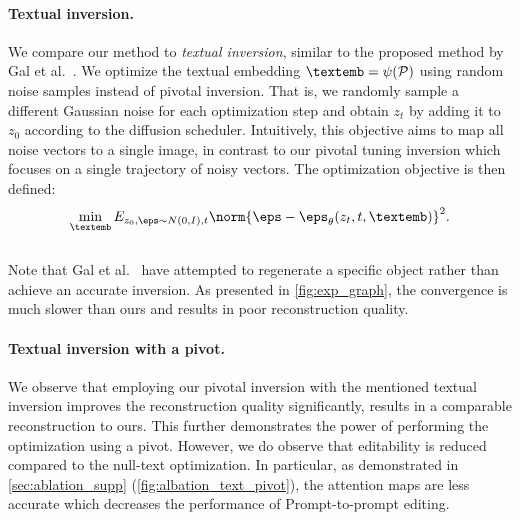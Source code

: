 \vspace{-0.4cm}
\paragraph{Textual inversion.}
We compare our method to \textit{textual inversion}, similar to the proposed method by Gal et al.~\cite{gal2022image}. We optimize the textual embedding $\textemb = \psi(\mathcal{P})$ using random noise samples instead of pivotal inversion. 
That is, we randomly sample a different Gaussian noise for each optimization step and obtain $z_t$ by adding it to $z_0$ according to the diffusion scheduler. Intuitively, this objective aims to map all noise vectors to a single image, in contrast to our pivotal tuning inversion which focuses on a single trajectory of noisy vectors. The optimization objective is then defined: \\[-8pt]
\begin{equation}
\min_\textemb E_{z_0,\eps\sim N(0,I),t} \norm{\eps-\eps_\theta(z_t,t,\textemb)}^2.
\end{equation}
\\[-10pt]
Note that Gal et al.~\cite{gal2022image} have attempted to regenerate a specific object rather than achieve an accurate inversion. As presented in \cref{fig:exp_graph}, the convergence is much slower than ours and results in poor reconstruction quality.




\vspace{-0.4cm}
\paragraph{Textual inversion with a pivot.}
We observe that employing our pivotal inversion with the mentioned textual inversion improves the reconstruction quality significantly, results in a comparable reconstruction to ours. This further demonstrates the power of performing the optimization using a pivot. However, we do observe that editability is reduced compared to the null-text optimization. In particular, as demonstrated in \cref{sec:ablation_supp} (\cref{fig:albation_text_pivot}), the attention maps are less accurate which decreases the performance of Prompt-to-prompt editing.








\vspace{-0.4cm}

